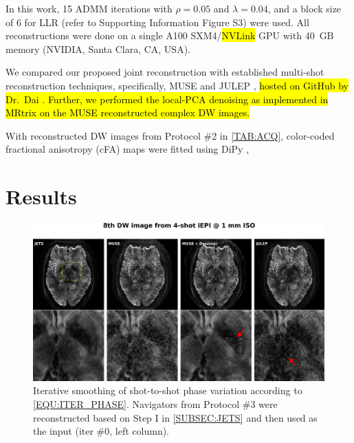 \documentclass[preprint,12pt,authoryear,review]{elsarticle}
\begin{document}
    In this work, 15 ADMM iterations with $\rho = 0.05$ and $\lambda = 0.04$,
    and a block size of 6 for LLR (refer to Supporting Information Figure S3)
    were used.
    All reconstructions were done on a single A100 SXM4/\hl{NVLink} GPU 
    with \SI{40}{GB} memory (NVIDIA, Santa Clara, CA, USA).

    We compared our proposed joint reconstruction
    with established multi-shot reconstruction techniques,
    specifically, MUSE \citep{chen_2013_muse}
    and JULEP \citep{dai_2023_julep},
    \hl{hosted on GitHub by Dr.~Dai \mbox{\citep{dai_2023_julep}}.
    Further, we performed
    the local-PCA denoising \mbox{\citep{cordero_2019_cplxdwi}}
    as implemented in MRtrix \mbox{\citep{Tournier_2019_mrtrix}}
    on the MUSE reconstructed complex DW images.} 

    With reconstructed DW images from Protocol \#2 in \cref{TAB:ACQ},
    color-coded fractional anisotropy (cFA) maps
    \citep{basser_1994_dmri} were fitted using DiPy \citep{garyfallidis_2014_dipy},

    \pagebreak

    \section{Results}
    \label{SEC_Resl}


    \begin{figure}
        \centering
        \includegraphics[width=0.85\linewidth]{../figures/fig3.png}
        \caption{Iterative smoothing of shot-to-shot phase variation
        according to \cref{EQU:ITER_PHASE}.
        Navigators from Protocol \#3 were reconstructed
        based on Step I in \cref{SUBSEC:JETS}
        and then used as the input (iter \#0, left column).}
        \label{FIG:iter_phase}
    \end{figure}
\end{document}
